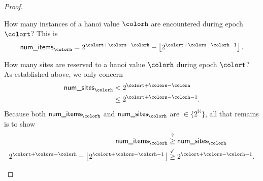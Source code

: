 \begin{proof}
\begin{proofpart}
\annotate[yshift=1em]{above,right}{numsitesh}{$|\{
  \colork \in [0\twodots\colorS) : \colorHcal_{\colort}(\colork) = \colorh
\}|$}

How many instances of a hanoi value $\colorh$ are encountered during epoch $\colort$?
This is
\begin{align*}
\textsf{num\_items}_{\colorh}
= 2^{\colort + \colors - \colorh} - \left\lfloor 2^{\colort + \colors - \colorh - 1}\right\rfloor.
\end{align*}

How many sites are reserved to a hanoi value $\colorh$ during epoch $\colort$?
As established above, we only concern
\begin{align*}
\textsf{num\_sites}_{\colorh}
&<
2^{\colort + \colors - \colorh}\\
&\leq
2^{\colort + \colors - \colorh - 1}.
\end{align*}
Because both $\textsf{num\_items}_{\colorh}$ and $\textsf{num\_sites}_{\colorh}$ are $\in \{2^{\mathbb{N}}\}$, all that remains is to show
\begin{align*}
\textsf{num\_items}_{\colorh}
&\stackrel{?}{\geq}
\textsf{num\_sites}_{\colorh}\\
2^{\colort + \colors - \colorh} - \left\lfloor 2^{\colort + \colors - \colorh - 1}\right\rfloor
&\stackrel{\checkmark}{\geq}
2^{\colort + \colors - \colorh - 1}.
\end{align*}
\end{proofpart}
\end{proof}
